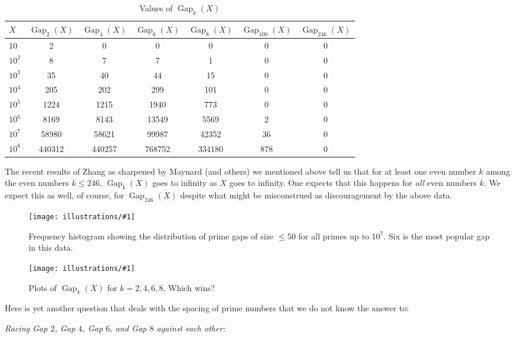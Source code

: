 \documentclass[openany]{book}
\DeclareMathOperator{\Gap}{Gap}
\newcommand{\ill}[3]{%
   \begin{figure}[H]%
   \vspace{-2ex}
   \centering%
   \texttt{[image: illustrations/\#1]}%
   \caption{#3}%
   \vspace{-2ex}
    \end{figure}}
\theoremstyle{plain}
\theoremstyle{definition}
\begin{document}
\begin{table}[H]\centering
\caption{Values of $\Gap_{k}(X)$ \label{tab:gap}}
\vspace{1em}

{\small
\begin{tabular}{|l|c|c|c|c|c|c|}\hline
$X$ & $\Gap_{2}(X)$ & $\Gap_{4}(X)$& $\Gap_{6}(X)$ & $\Gap_{8}(X)$ &
 $\Gap_{100}(X)$ &   $\Gap_{246}(X)$\\\hline

$10$ & 2 & 0 & 0 & 0 & 0 & 0\\\hline
$10^{2}$ & 8 & 7 & 7 & 1 & 0 & 0\\\hline
$10^{3}$ & 35 & 40 & 44 & 15 & 0 & 0\\\hline
$10^{4}$ & 205 & 202 & 299 & 101 & 0 & 0\\\hline
$10^{5}$ & 1224 & 1215 & 1940 & 773 & 0 & 0\\\hline
$10^{6}$ & 8169 & 8143 & 13549 & 5569 & 2 & 0\\\hline
$10^{7}$ & 58980 & 58621 & 99987 & 42352 & 36 & 0\\\hline
$10^{8}$ & 440312 & 440257 & 768752 & 334180 & 878 & 0\\\hline

\end{tabular}
}
\end{table}

 The recent results of Zhang as sharpened by Maynard (and others) we mentioned above tell us that for  at least one even number $k$ among the  even numbers $k \le 246$,    $\Gap_{k}(X)$ goes to infinity as $X$ goes to infinity. One expects that this happens for {\it all} even numbers $k$. We expect this as well, of course, for $\Gap_{246}(X)$ despite what might be misconstrued as discouragement by the above data.

\ill{primegapdist}{1}{Frequency histogram showing the distribution\index{distribution} of
  prime gaps of size $\leq 50$ for all primes up to $10^7$.  Six is
  the most popular gap in this data.
\label{fig:primegapdist}}


\ill{primegap_race}{1}{Plots of $\Gap_k(X)$ for $k=2,4,6,8$.  Which wins?}

Here is yet another question that deals with the spacing of prime
numbers that we do not know the answer to:

{\em Racing Gap $2$,  Gap $4$, Gap $6$, and Gap $8$ against each other:}
\end{document}
